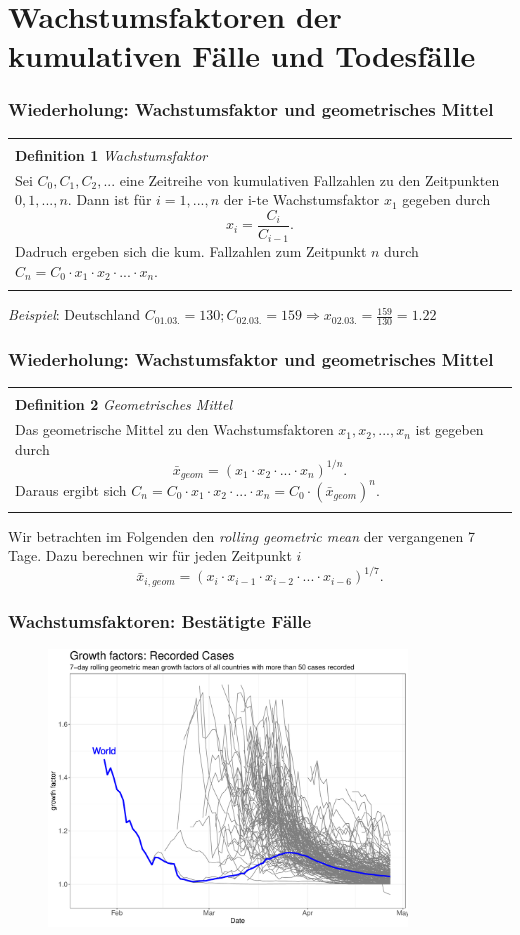 \documentclass{beamer}
\newenvironment{boxeded}
    {\begin{center}
    \begin{tabular}{|p{0.9\textwidth}|}
    \hline\\
    }
    { 
    \\\\\hline
    \end{tabular} 
    \end{center}
    }
\begin{document}
\section{Wachstumsfaktoren der kumulativen Fälle und Todesfälle}
\begin{frame}
	\frametitle{Wiederholung: Wachstumsfaktor und geometrisches Mittel}
	\begin{boxeded}
		\textbf{Definition 1} \textit{Wachstumsfaktor}\\
		Sei $C_0, C_1, C_2, ...$ eine Zeitreihe von kumulativen Fallzahlen zu den Zeitpunkten $0, 1, ..., n$. Dann ist für $i = 1, ..., n$ der i-te Wachstumsfaktor $x_1$ gegeben durch $$ x_i = \frac{C_i}{C_{i-1}}.$$
		Dadruch ergeben sich die kum. Fallzahlen zum Zeitpunkt $n$ durch $C_n = C_0 \cdot x_1 \cdot x_2 \cdot ... \cdot x_n$.
	\end{boxeded}

	\emph{Beispiel}: Deutschland $C_{01.03.} = 130; C_{02.03.}= 159 \Rightarrow x_{02.03.}=\frac{159}{130}=1.22$
\end{frame}

\begin{frame}
	\frametitle{Wiederholung: Wachstumsfaktor und geometrisches Mittel}
	\begin{boxeded}
		\textbf{Definition 2} \textit{Geometrisches Mittel}\\
		Das geometrische Mittel zu den Wachstumsfaktoren $x_1, x_2, ..., x_n$ ist gegeben durch $$\bar{x}_{geom} = (x_1 \cdot x_2 \cdot ... \cdot x_n)^{1/n}.$$ Daraus ergibt sich $C_n = C_0 \cdot x_1 \cdot x_2 \cdot ... \cdot x_n = C_0 \cdot (\bar{x}_{geom})^n$.
	\end{boxeded}
	\pause
	Wir betrachten im Folgenden den \emph{rolling geometric mean} der vergangenen 7 Tage. Dazu berechnen wir für jeden Zeitpunkt $i$ $$\bar{x}_{i, geom} = (x_i \cdot x_{i-1} \cdot x_{i-2} \cdot ... \cdot x_{i-6})^{1/7}.$$
\end{frame}

\begin{frame}
	\frametitle{Wachstumsfaktoren: Bestätigte Fälle}
	\begin{figure}
		\centering
		\includegraphics[width = 270pt]{GF_confirmed}
	\end{figure}
\end{frame}
\end{document}
